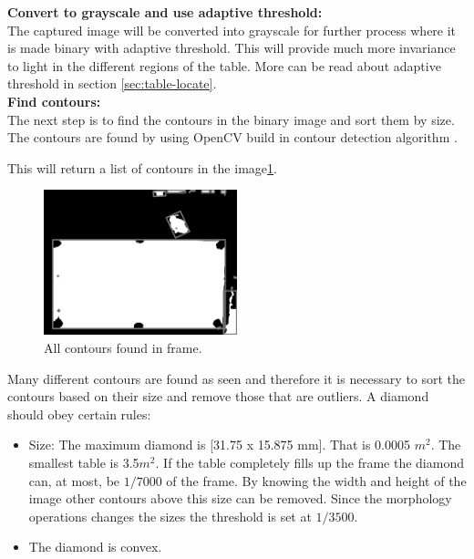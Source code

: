 
\textbf{Convert to grayscale and use adaptive threshold:}\\
The captured image will be converted into grayscale for further process where it is made binary with adaptive threshold. This will provide much more invariance to light in the different regions of the table. More can be read about adaptive threshold in section \ref{sec:table-locate}.\\


\textbf{Find contours:}\\
The next step is to find the contours in the binary image and sort them by size. The contours are found by using OpenCV build in contour detection algorithm \cite{contour}.

This will return a list of contours in the image\ref{fig:allcontours}.

\begin{figure}[H]
\begin{center}
\leavevmode
\includegraphics[width=0.5\textwidth]{images/allcontours.png}
\end{center}
\caption{All contours found in frame.}
\label{fig:allcontours}
\end{figure}

Many different contours are found as seen and therefore it is necessary to sort the contours based on their size and remove those that are outliers. A diamond should obey certain rules:

\begin{itemize}
	\item Size: The maximum diamond is [31.75 x 15.875 mm]. That is 0.0005 $m^2$. The smallest table is 3.5$m^2$. If the table completely fills up the frame the diamond can, at most, be $1/7000$ of the frame. By knowing the width and height of the image other contours above this size can be removed. Since the morphology operations changes the sizes the threshold is set at $1/3500$.
	\item The diamond is convex.
\end{itemize}

